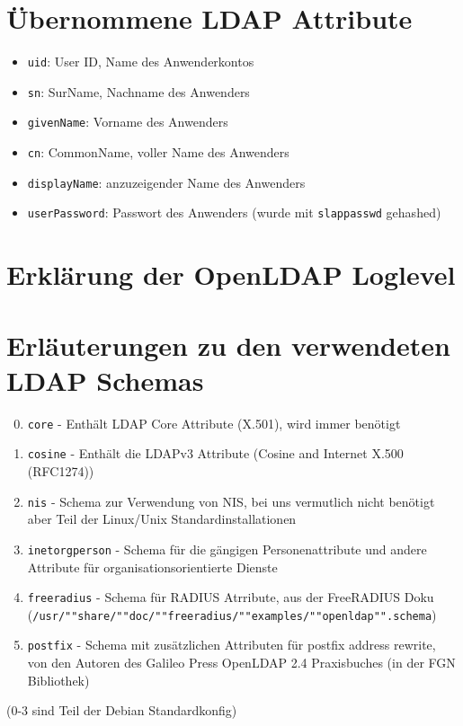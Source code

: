 \documentclass[11pt,a4paper,titlepage=firstiscover,headsepline]{scrartcl} %
\begin{document}
\appendix
\newpage
{} %
\section{Übernommene LDAP Attribute} \label{sec:LDAP-Attribute}
\begin{itemize}
\item\texttt{uid}: User ID, Name des Anwenderkontos
\item\texttt{sn}: SurName, Nachname des Anwenders
\item\texttt{givenName}: Vorname des Anwenders
\item\texttt{cn}: CommonName, voller Name des Anwenders
\item\texttt{displayName}: anzuzeigender Name des Anwenders
\item\texttt{userPassword}: Passwort des Anwenders (wurde mit \texttt{slappasswd} gehashed)
\end{itemize}

\newpage
\section{Erklärung der OpenLDAP Loglevel} \label{sec:LDAP-Loglevel}

\newpage
\section{Erläuterungen zu den verwendeten LDAP Schemas}\label{sec:LDAP-Schema}
\begin{enumerate}
\setcounter{enumi}{-1}
\item \texttt{core} - Enthält LDAP Core Attribute (X.501), wird immer benötigt
\item \texttt{cosine} - Enthält die LDAPv3 Attribute (Cosine and Internet X.500 (RFC1274))
\item \texttt{nis} - Schema zur Verwendung von NIS, bei uns vermutlich nicht benötigt aber Teil der Linux/Unix Standardinstallationen
\item \texttt{inetorgperson} - Schema für die gängigen Personenattribute und andere Attribute für organisationsorientierte Dienste
\item \texttt{freeradius} - Schema für RADIUS Atrribute, aus der FreeRADIUS Doku (\texttt{/usr/""share/""doc/""freeradius/""examples/""openldap"".schema})
\item \texttt{postfix} - Schema mit zusätzlichen Attributen für postfix address rewrite, von den Autoren des Galileo Press OpenLDAP 2.4 Praxisbuches (in der FGN Bibliothek)
\end{enumerate}
(0-3 sind Teil der Debian Standardkonfig)
\end{document}
